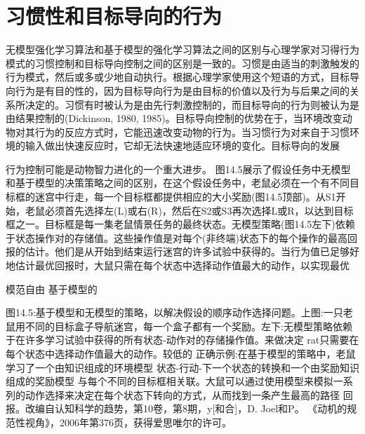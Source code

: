 \section{习惯性和目标导向的行为}

无模型强化学习算法和基于模型的强化学习算法之间的区别与心理学家对习得行为模式的习惯控制和目标导向控制之间的区别是一致的。习惯是由适当的刺激触发的行为模式，然后或多或少地自动执行。根据心理学家使用这个短语的方式，目标导向行为是有目的性的，因为目标导向行为是由目标的价值以及行为与后果之间的关系所决定的。习惯有时被认为是由先行刺激控制的，而目标导向的行为则被认为是由结果控制的(Dickinson, 1980, 1985)。目标导向控制的优势在于，当环境改变动物对其行为的反应方式时，它能迅速改变动物的行为。当习惯行为对来自于习惯环境的输入做出快速反应时，它却无法快速地适应环境的变化。目标导向的发展

行为控制可能是动物智力进化的一个重大进步。
图14.5展示了假设任务中无模型和基于模型的决策策略之间的区别，在这个假设任务中，老鼠必须在一个有不同目标框的迷宫中行走，每一个目标框都提供相应的大小奖励(图14.5顶部)。从S1开始，老鼠必须首先选择左(L)或右(R)，然后在S2或S3再次选择L或R，以达到目标框之一。目标框是每一集老鼠情景任务的最终状态。无模型策略(图14.5左下)依赖于状态操作对的存储值。这些操作值是对每个(非终端)状态下的每个操作的最高回报的估计。他们是从开始到结束运行迷宫的许多试验中获得的。当行为值已足够好地估计最优回报时，大鼠只需在每个状态中选择动作值最大的动作，以实现最优
 

模范自由 					基于模型的

图14.5:基于模型和无模型的策略，以解决假设的顺序动作选择问题。上图:一只老鼠用不同的目标盒子导航迷宫，每一个盒子都有一个奖励。左下:无模型策略依赖于在许多学习试验中获得的所有状态-动作对的存储操作值。来做决定
rat只需要在每个状态中选择动作值最大的动作。较低的
正确示例:在基于模型的策略中，老鼠学习了一个由知识组成的环境模型
状态-行动-下一个状态的转换和一个由奖励知识组成的奖励模型
与每个不同的目标框相关联。大鼠可以通过使用模型来模拟一系列的动作选择来决定在每个状态下转向的方式，从而找到一条产生最高的路径
回报。改编自认知科学的趋势，第10卷，第8期，y[和合]，D. Joel和P。
《动机的规范性视角》，2006年第376页，获得爱思唯尔的许可。

